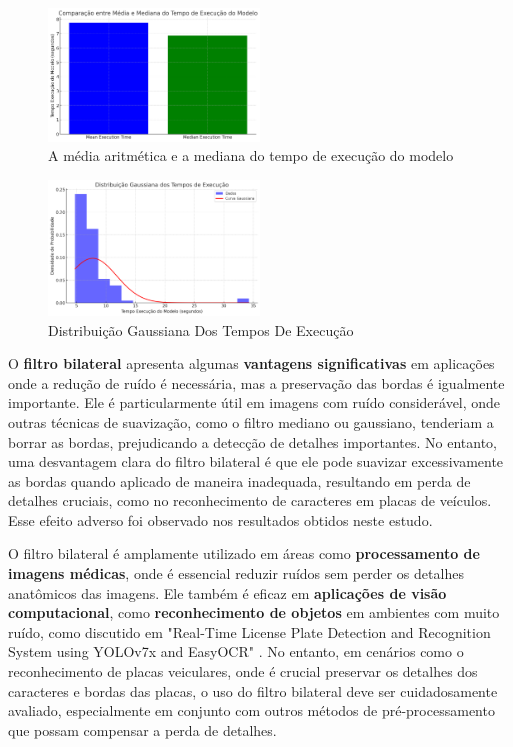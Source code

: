 \documentclass[conference]{IEEEtran}
\begin{document}
\begin{figure}[htbp]
	\centerline{\includegraphics[width=0.5\textwidth]{img14.png}}
	\caption{A média aritmética e a mediana do tempo de execução do modelo}
	\label{img14}
\end{figure}

\begin{figure}[htbp]
	\centerline{\includegraphics[width=0.5\textwidth]{img15.png}}
	\caption{Distribuição Gaussiana Dos Tempos De Execução}
	\label{img15}
\end{figure}


O \textbf{filtro bilateral} apresenta algumas \textbf{vantagens significativas} em aplicações onde a redução de ruído é necessária, mas a preservação das bordas é igualmente importante. Ele é particularmente útil em imagens com ruído considerável, onde outras técnicas de suavização, como o filtro mediano ou gaussiano, tenderiam a borrar as bordas, prejudicando a detecção de detalhes importantes. No entanto, uma desvantagem clara do filtro bilateral é que ele pode suavizar excessivamente as bordas quando aplicado de maneira inadequada, resultando em perda de detalhes cruciais, como no reconhecimento de caracteres em placas de veículos. Esse efeito adverso foi observado nos resultados obtidos neste estudo.

O filtro bilateral é amplamente utilizado em áreas como \textbf{processamento de imagens médicas}, onde é essencial reduzir ruídos sem perder os detalhes anatômicos das imagens. Ele também é eficaz em \textbf{aplicações de visão computacional}, como \textbf{reconhecimento de objetos} em ambientes com muito ruído, como discutido em "Real-Time License Plate Detection and Recognition System using YOLOv7x and EasyOCR" \cite{b2}. No entanto, em cenários como o reconhecimento de placas veiculares, onde é crucial preservar os detalhes dos caracteres e bordas das placas, o uso do filtro bilateral deve ser cuidadosamente avaliado, especialmente em conjunto com outros métodos de pré-processamento que possam compensar a perda de detalhes.
\end{document}
